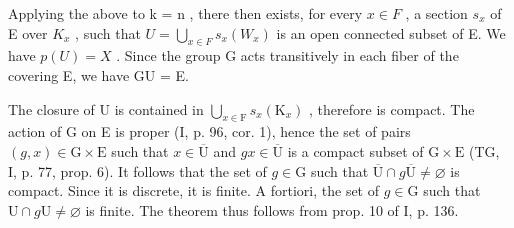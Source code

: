 Applying the above to k = n , there then exists, for every \(x \in F\) , a section \(s_x\) of E over \(K_x\) , such that \(U = \bigcup_{x \in F} s_x(W_x)\) is an open connected subset of E. We have \(p(U) = X\) . Since the group G acts transitively in each fiber of the covering E, we have GU = E.

The closure of U is contained in \(\bigcup_{x\in\mathrm{F}}s_x(\mathrm{K}_x)\) , therefore is compact. The action of G on E is proper (I, p. 96, cor. 1), hence the set of pairs \((g,x)\in\mathrm{G}\times\mathrm{E}\) such that \(x\in\overline{\mathrm{U}}\) and \(gx\in\overline{\mathrm{U}}\) is a compact subset of \(\mathrm{G}\times\mathrm{E}\) (TG, I, p. 77, prop. 6). It follows that the set of \(g\in\mathrm{G}\) such that \(\overline{\mathrm{U}}\cap g\overline{\mathrm{U}}\neq\varnothing\) is compact. Since it is discrete, it is finite. A fortiori, the set of \(g\in\mathrm{G}\) such that \(\mathrm{U}\cap g\mathrm{U}\neq\varnothing\) is finite. The theorem thus follows from prop. 10 of I, p. 136.

